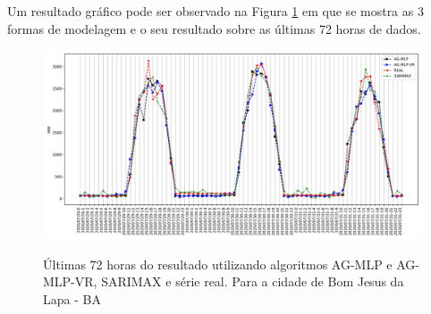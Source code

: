 Um resultado gráfico pode ser observado na Figura \ref{fig:cap4_bjl_3_days_hibrids} em que se mostra as 3 formas de modelagem e o seu resultado sobre as últimas 72 horas de dados.

\begin{figure}[!htbp]
    \centering
    \caption{Últimas 72 horas do resultado utilizando algoritmos AG-MLP e AG-MLP-VR, SARIMAX e série real. Para a cidade de Bom Jesus da Lapa - BA}
    \includegraphics[width=\textwidth]{Figuras/results/comparison_hibrids_bjl.png}
    \label{fig:cap4_bjl_3_days_hibrids}
\end{figure}

